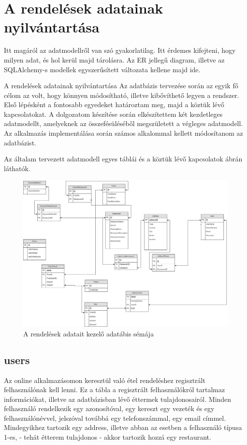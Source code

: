\chapter{A rendelések adatainak nyilvántartása}

Itt magáról az adatmodellről van szó gyakorlatilag. Itt érdemes kifejteni, hogy milyen adat, és hol kerül majd tárolásra. Az ER jellegű diagram, illetve az SQLAlchemy-s modellek egyszerűsített változata kellene majd ide.

A rendelések adatainak nyilvántartása
Az adatbázis tervezése során az egyik fő célom az volt, hogy könnyen módosítható, illetve kibővíthető legyen a rendszer. Első lépésként a fontosabb egyedeket határoztam meg, majd a köztük lévő kapcsolatokat. A dolgozatom készítése során elkészítettem két kezdetleges adatmodellt, amelyeknek az összefésüléséből megszületett a végleges adatmodell. Az alkalmazás implementálása során számos alkalommal kellett módosítanom az adatbázist.

Az általam tervezett adatmodell egyes táblái és a köztük lévő kapcsolatok  ábrán láthatók.

\begin{figure}
\includegraphics[scale=0.3]{kepek/rendeles_sema.jpg}
\caption{A rendelések adatait kezelő adatábis sémája}
\label{fig:rendeles_sema}
\end{figure}

\section{users}

Az online alkalmazásomon keresztül való étel rendeléshez regisztrált felhasználónak kell lenni. Ez a tábla a regisztrált felhasználókról tartalmaz információkat, illetve az adatbázisban lévő éttermek tulajdonosairól. Minden felhasználó rendelkezik egy azonosítóval, egy kereszt egy vezeték és egy felhasználónévvel, jelszóval továbbá egy telefonszámmal, egy email címmel. Mindegyikhez tartozik egy address, illetve abban az esetben a felhasználó típusa 1-es, - tehát étterem tulajdonos - akkor tartozik hozzá egy restaurant.

